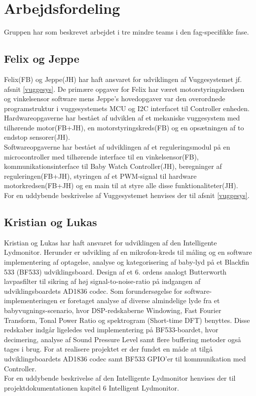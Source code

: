 \section{Arbejdsfordeling}

Gruppen har som beskrevet arbejdet i tre mindre teams i den fag-specifikke fase. 

\subsection*{Felix og Jeppe}
Felix(FB) og Jeppe(JH) har haft ansvaret for udviklingen af Vuggesystemet jf. afsnit \vref{vuggesys}. De primære opgaver for Felix har været motorstyringskredsen og vinkelsensor software mens Jeppe's hovedopgaver var den overordnede programstruktur i vuggesystemets MCU og I2C interfacet til Controller enheden.\\ 
Hardwareopgaverne har bestået af udviklen af et mekaniske vuggesystem med tilhørende motor(FB+JH), en motorstyringskreds(FB) og en opsætningen af to endstop sensorer(JH).\\
Softwareopgaverne har bestået af udviklingen af et reguleringsmodul på en microcontroller med tilhørende interface til en vinkelsensor(FB), kommunikationsinterface til Baby Watch Controller(JH), beregninger af reguleringen(FB+JH), styringen af et PWM-signal til hardware motorkredsen(FB+JH) og en main til at styre alle disse funktionaliteter(JH). \\
For en uddybende beskrivelse af Vuggesystemet henvises der til afsnit \vref{vuggesys}.

\subsection*{Kristian og Lukas}
Kristian og Lukas har haft ansvaret for udviklingen af den Intelligente Lydmonitor. Herunder er udvikling af en mikrofon-kreds til måling  og en software implementering af optagelse, analyse og kategorisering af baby-lyd på et Blackfin 533 (BF533) udviklingsboard. Design af et 6. ordens analogt Butterworth lavpasfilter til sikring af høj signal-to-noise-ratio på indgangen af udviklingsboardets AD1836 codec. Som forundersøgelse for software-implementeringen er foretaget analyse af diverse almindelige lyde fra et babyvugnings-scenario, hvor DSP-redskaberne Windowing, Fast Fourier Transform, Tonal Power Ratio og spektrogram (Short-time DFT) benyttes. Disse redskaber indgår ligeledes ved implementering på BF533-boardet, hvor decimering, analyse af Sound Pressure Level samt flere buffering metoder også tages i brug. For at realisere projektet er der fundet en måde at tilgå udviklingsboardets AD1836 codec samt BF533 GPIO'er til kommunikation med Controller.  \\
For en uddybende beskrivelse af den Intelligente Lydmonitor henvises der til projektdokumentationen kapitel 6 Intelligent Lydmonitor.

